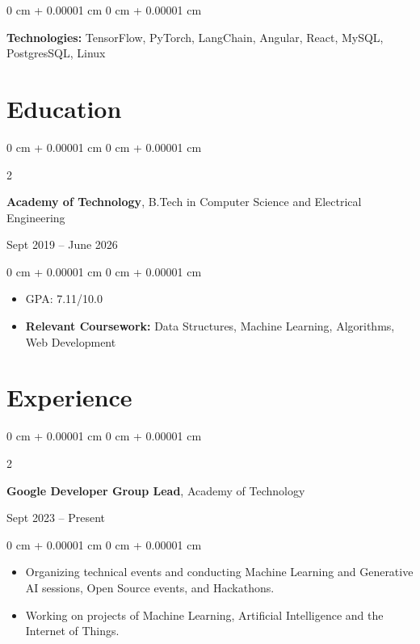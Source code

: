 \documentclass[10pt, letterpaper]{article}
\newenvironment{highlights}{
    \begin{itemize}[
        topsep=0.10 cm,
        parsep=0.10 cm,
        partopsep=0pt,
        itemsep=0pt,
        leftmargin=0 cm + 10pt
    ]
}{
    \end{itemize}
} %
\newenvironment{onecolentry}{
    \begin{adjustwidth}{
        0 cm + 0.00001 cm
    }{
        0 cm + 0.00001 cm
    }
}{
    \end{adjustwidth}
} %
\newenvironment{twocolentry}[2][]{
    \onecolentry
    \def\secondColumn{#2}
    \setcolumnwidth{\fill, 4.5 cm}
    \begin{paracol}{2}
}{
    \switchcolumn \raggedleft \secondColumn
    \end{paracol}
    \endonecolentry
} %
\begin{document}
\vspace{0.2 cm}

\begin{onecolentry}
    \textbf{Technologies:} TensorFlow, PyTorch, LangChain, Angular, React, MySQL, PostgresSQL, Linux
\end{onecolentry}

\section{Education}

\begin{twocolentry}{
    Sept 2019 – June 2026
}
    \textbf{Academy of Technology}, B.Tech in Computer Science and Electrical Engineering
\end{twocolentry}

\vspace{0.10 cm}

\begin{onecolentry}
    \begin{highlights}
        \item GPA: 7.11/10.0
        \item \textbf{Relevant Coursework:} Data Structures, Machine Learning, Algorithms, Web Development
    \end{highlights}
\end{onecolentry}

\section{Experience}

\begin{twocolentry}{
    Sept 2023 – Present
}
    \textbf{Google Developer Group Lead}, Academy of Technology
\end{twocolentry}

\vspace{0.10 cm}

\begin{onecolentry}
    \begin{highlights}
        \item Organizing technical events and conducting Machine Learning and Generative AI sessions, Open Source events, and Hackathons. 
        \item Working on projects of Machine Learning, Artificial Intelligence and the Internet of Things.
    \end{highlights}
\end{onecolentry}
\end{document}
